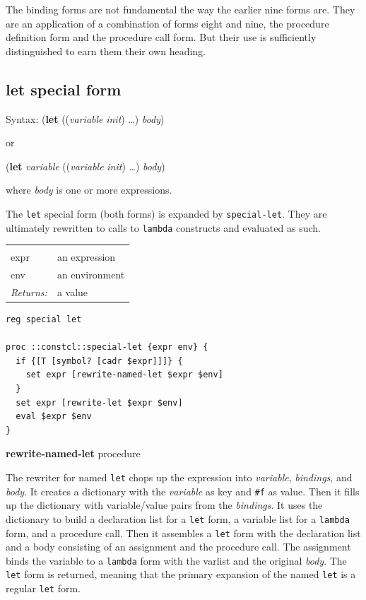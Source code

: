 \documentclass[twoside]{report}
\begin{document}
The binding forms are not fundamental the way the earlier nine forms are. They are an application of a combination of forms eight and nine, the procedure definition form and the procedure call form. But their use is sufficiently distinguished to earn them their own heading.

\subsection{let special form}
\label{let-special-form}

Syntax: (\textbf{let} ((\emph{variable} \emph{init}) \ldots ) \emph{body})

or

(\textbf{let} \emph{variable} ((\emph{variable} \emph{init}) \ldots ) \emph{body})

where \emph{body} is one or more expressions.

The \texttt{let} special form (both forms) is expanded by \texttt{special-let}. They are ultimately rewritten to calls to \texttt{lambda} constructs and evaluated as such.

\noindent\begin{tabular}{ |p{1.9cm} p{8cm}| }
\hline
\rowcolor[HTML]{CCCCCC} \multicolumn{2}{|l|}{\bf special-let (internal)} \\
expr & an expression \\
env & an environment \\
\textit{Returns:} & a value \\
\hline
\end{tabular}

\begin{lstlisting}
reg special let

proc ::constcl::special-let {expr env} {
  if {[T [symbol? [cadr $expr]]]} {
    set expr [rewrite-named-let $expr $env]
  }
  set expr [rewrite-let $expr $env]
  eval $expr $env
}
\end{lstlisting}

\textbf{rewrite-named-let} procedure

The rewriter for named \texttt{let} chops up the expression into \emph{variable}, \emph{bindings}, and \emph{body}. It creates a dictionary with the \emph{variable} as key and \texttt{\#f} as value. Then it fills up the dictionary with variable/value pairs from the \emph{bindings}. It uses the dictionary to build a declaration list for a \texttt{let} form, a variable list for a \texttt{lambda} form, and a procedure call. Then it assembles a \texttt{let} form with the declaration list and a body consisting of an assignment and the procedure call. The assignment binds the variable to a \texttt{lambda} form with the varlist and the original \emph{body}. The \texttt{let} form is returned, meaning that the primary expansion of the named \texttt{let} is a regular \texttt{let} form.
\end{document}
